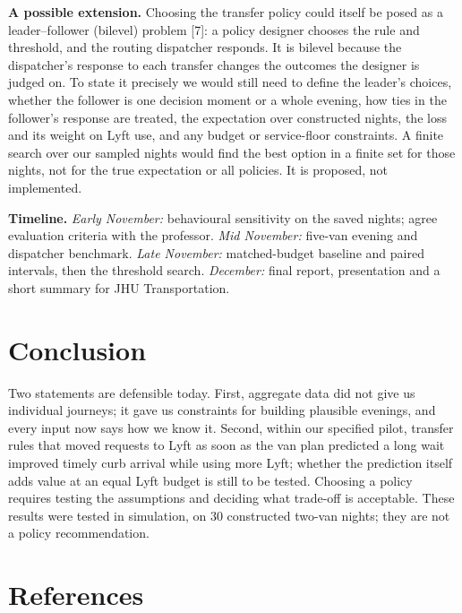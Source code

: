 \documentclass{article}
\begin{document}
\textbf{A possible extension.} Choosing the transfer policy could itself be posed as a leader--follower (bilevel) problem [7]: a policy designer chooses the rule and threshold, and the routing dispatcher responds. It is bilevel because the dispatcher's response to each transfer changes the outcomes the designer is judged on. To state it precisely we would still need to define the leader's choices, whether the follower is one decision moment or a whole evening, how ties in the follower's response are treated, the expectation over constructed nights, the loss and its weight on Lyft use, and any budget or service-floor constraints. A finite search over our sampled nights would find the best option in a finite set for those nights, not for the true expectation or all policies. It is proposed, not implemented.

\textbf{Timeline.} \emph{Early November:} behavioural sensitivity on the saved nights; agree evaluation criteria with the professor. \emph{Mid November:} five-van evening and dispatcher benchmark. \emph{Late November:} matched-budget baseline and paired intervals, then the threshold search. \emph{December:} final report, presentation and a short summary for JHU Transportation.

\section{Conclusion}\label{sec:conclusion}

Two statements are defensible today. First, aggregate data did not give us individual journeys; it gave us constraints for building plausible evenings, and every input now says how we know it. Second, within our specified pilot, transfer rules that moved requests to Lyft as soon as the van plan predicted a long wait improved timely curb arrival while using more Lyft; whether the prediction itself adds value at an equal Lyft budget is still to be tested. Choosing a policy requires testing the assumptions and deciding what trade-off is acceptable. These results were tested in simulation, on 30 constructed two-van nights; they are not a policy recommendation.

\section*{References}
\end{document}
